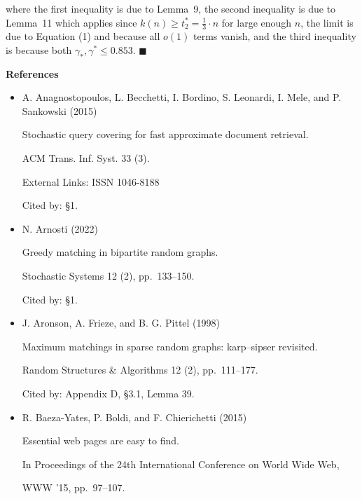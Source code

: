 where the first inequality is due to Lemma 9, the second inequality is due to Lemma 11 which applies since $k(n)\geq t^{*}_{2}=\frac{1}{3}\cdot n$ for large enough $n$, the limit is due to Equation (1) and because all $o(1)$ terms vanish, and the third inequality is because both $\gamma_{*},\gamma^{*}\leq 0.853$.
\ensuremath{\blacksquare}\par








\par\medskip\noindent\textbf{References}\par



\begin{itemize}


\item[] [1]
A. Anagnostopoulos, L. Becchetti, I. Bordino, S. Leonardi, I. Mele, and P. Sankowski (2015)

Stochastic query covering for fast approximate document retrieval.

ACM Trans. Inf. Syst. 33 (3).

External Links: ISSN 1046-8188

Cited by: §1.



\item[] [2]
N. Arnosti (2022)

Greedy matching in bipartite random graphs.

Stochastic Systems 12 (2), pp. 133–150.

Cited by: §1.



\item[] [3]
J. Aronson, A. Frieze, and B. G. Pittel (1998)

Maximum matchings in sparse random graphs: karp–sipser revisited.

Random Structures \& Algorithms 12 (2), pp. 111–177.

Cited by: Appendix D,
§3.1,
Lemma 39.



\item[] [4]
R. Baeza-Yates, P. Boldi, and F. Chierichetti (2015)

Essential web pages are easy to find.

In Proceedings of the 24th International Conference on World Wide Web,

WWW ’15, pp. 97–107.


\end{itemize}
